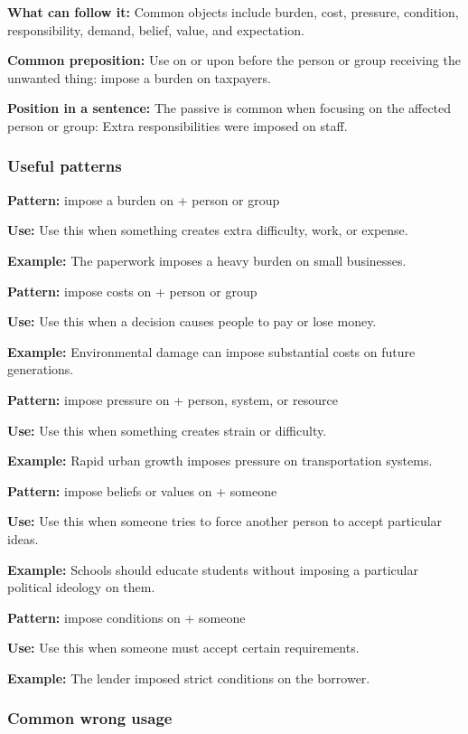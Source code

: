 \documentclass[11pt]{article}
\begin{document}
\textbf{What can follow it:} Common objects include burden, cost, pressure, condition, responsibility, demand, belief, value, and expectation.

\textbf{Common preposition:} Use on or upon before the person or group receiving the unwanted thing: impose a burden on taxpayers.

\textbf{Position in a sentence:} The passive is common when focusing on the affected person or group: Extra responsibilities were imposed on staff.

\subsubsection{Useful patterns}
\textbf{Pattern:} impose a burden on + person or group

\textbf{Use:} Use this when something creates extra difficulty, work, or expense.

\textbf{Example:} The paperwork imposes a heavy burden on small businesses.

\textbf{Pattern:} impose costs on + person or group

\textbf{Use:} Use this when a decision causes people to pay or lose money.

\textbf{Example:} Environmental damage can impose substantial costs on future generations.

\textbf{Pattern:} impose pressure on + person, system, or resource

\textbf{Use:} Use this when something creates strain or difficulty.

\textbf{Example:} Rapid urban growth imposes pressure on transportation systems.

\textbf{Pattern:} impose beliefs or values on + someone

\textbf{Use:} Use this when someone tries to force another person to accept particular ideas.

\textbf{Example:} Schools should educate students without imposing a particular political ideology on them.

\textbf{Pattern:} impose conditions on + someone

\textbf{Use:} Use this when someone must accept certain requirements.

\textbf{Example:} The lender imposed strict conditions on the borrower.

\subsubsection{Common wrong usage}
\end{document}

